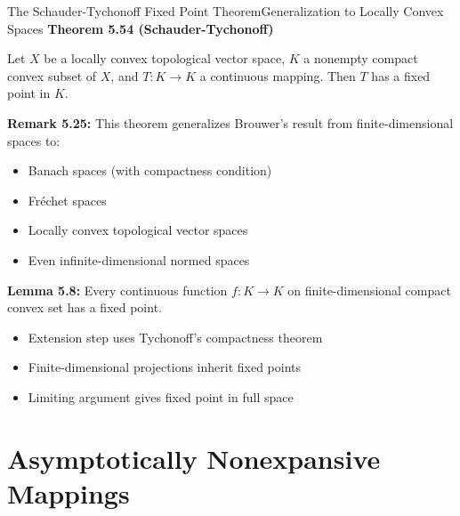 \documentclass[aspectratio=169,10pt]{beamer}
\begin{document}
\begin{frame}{The Schauder-Tychonoff Fixed Point Theorem}{Generalization to Locally Convex Spaces}
    \textbf{Theorem 5.54 (Schauder-Tychonoff)}

    Let $X$ be a locally convex topological vector space, $K$ a nonempty compact convex subset of $X$, and $T: K \to K$ a continuous mapping. Then $T$ has a fixed point in $K$.

    \vspace{0.3cm}
    \textbf{Remark 5.25:} This theorem generalizes Brouwer's result from finite-dimensional spaces to:
    \begin{itemize}
        \item Banach spaces (with compactness condition)
        \item Fréchet spaces
        \item Locally convex topological vector spaces
        \item Even infinite-dimensional normed spaces
    \end{itemize}

    \vspace{0.3cm}
    \textbf{Lemma 5.8:} Every continuous function $f: K \to K$ on finite-dimensional compact convex set has a fixed point.

    \begin{itemize}
        \item Extension step uses Tychonoff's compactness theorem
        \item Finite-dimensional projections inherit fixed points
        \item Limiting argument gives fixed point in full space
    \end{itemize}
\end{frame}

\section{Asymptotically Nonexpansive Mappings}
\end{document}
